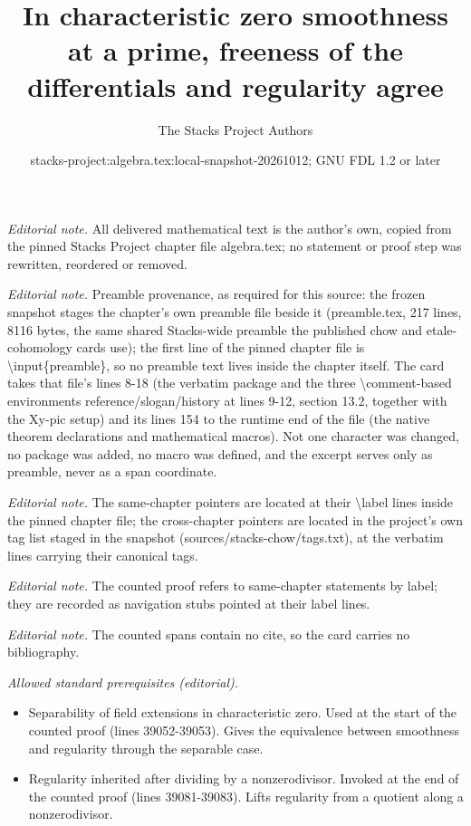 \documentclass[10pt,a4paper]{amsart}
\title{In characteristic zero smoothness at a prime, freeness of the differentials and regularity agree}
\author{The Stacks Project Authors}
\date{stacks-project:algebra.tex:local-snapshot-20261012; GNU FDL 1.2 or later}
\theoremstyle{plain}
\theoremstyle{definition}
\theoremstyle{remark}
\numberwithin{equation}{subsection}
\begin{document}
\maketitle
\noindent\textit{Editorial note.} All delivered mathematical text is the author's own, copied from the pinned Stacks Project chapter file algebra.tex; no statement or proof step was rewritten, reordered or removed.\par\medskip
\noindent\textit{Editorial note.} Preamble provenance, as required for this source: the frozen snapshot stages the chapter's own preamble file beside it (preamble.tex, 217 lines, 8116 bytes, the same shared Stacks-wide preamble the published chow and etale-cohomology cards use); the first line of the pinned chapter file is \textbackslash{}input\{preamble\}, so no preamble text lives inside the chapter itself. The card takes that file's lines 8-18 (the verbatim package and the three \textbackslash{}comment-based environments reference/slogan/history at lines 9-12, section 13.2, together with the Xy-pic setup) and its lines 154 to the runtime end of the file (the native theorem declarations and mathematical macros). Not one character was changed, no package was added, no macro was defined, and the excerpt serves only as preamble, never as a span coordinate.\par\medskip
\noindent\textit{Editorial note.} The same-chapter pointers are located at their \textbackslash{}label lines inside the pinned chapter file; the cross-chapter pointers are located in the project's own tag list staged in the snapshot (sources/stacks-chow/tags.txt), at the verbatim lines carrying their canonical tags.\par\medskip
\noindent\textit{Editorial note.} The counted proof refers to same-chapter statements by label; they are recorded as navigation stubs pointed at their label lines.\par\medskip
\noindent\textit{Editorial note.} The counted spans contain no cite, so the card carries no bibliography.\par\medskip
\noindent\textit{Allowed standard prerequisites (editorial).}\begin{itemize}
\item Separability of field extensions in characteristic zero. Used at the start of the counted proof (lines 39052-39053). Gives the equivalence between smoothness and regularity through the separable case.
\item Regularity inherited after dividing by a nonzerodivisor. Invoked at the end of the counted proof (lines 39081-39083). Lifts regularity from a quotient along a nonzerodivisor.
\end{itemize}\medskip
\end{document}
